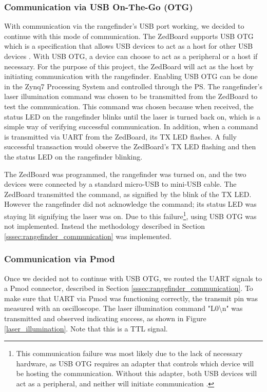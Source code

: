 \subsubsection{Communication via USB On-The-Go (OTG)}
With communication via the rangefinder's USB port working, we decided to continue with this mode of communication. The ZedBoard supports USB OTG which is a specification that allows USB devices to act as a host for other USB devices \cite{usb-otg}. With USB OTG, a device can choose to act as a peripheral or a host if necessary. For the purpose of this project, the ZedBoard will act as the host by initiating communication with the rangefinder. Enabling USB OTG can be done in the Zynq7 Processing System and controlled through the PS. The rangefinder's laser illumination command was chosen to be transmitted from the ZedBoard to test the communication. This command was chosen because when received, the status LED on the rangefinder blinks until the laser is turned back on, which is a simple way of verifying successful communication. In addition, when a command is transmitted via UART from the ZedBoard, its TX LED flashes. A fully successful transaction would observe the ZedBoard's TX LED flashing and then the status LED on the rangefinder blinking.
\par
The ZedBoard was programmed, the rangefinder was turned on, and the two devices were connected by a standard micro-USB to mini-USB cable. The ZedBoard transmitted the command, as signified by the blink of the TX LED. However the rangefinder did not acknowledge the command; its status LED was staying lit signifying the laser was on. Due to this failure\footnote{This communication failure was most likely due to the lack of necessary hardware, as USB OTG requires an adapter that controls which device will be hosting the communication. Without this adapter, both USB devices will act as a peripheral, and neither will initiate communication \cite{usb-otg}.}, using USB OTG was not implemented. Instead the methodology described in Section \ref{sssec:rangefinder_communication} was implemented.

\subsubsection{Communication via Pmod}
Once we decided not to continue with USB OTG, we routed the UART signals to a Pmod connector, described in Section \ref{sssec:rangefinder_communication}. To make sure that UART via Pmod was functioning correctly, the transmit pin was measured with an oscilloscope. The laser illumination command "L0\textbackslash{}n" was transmitted and observed indicating success, as shown in Figure \ref{laser_illumination}. Note that this is a TTL signal.

